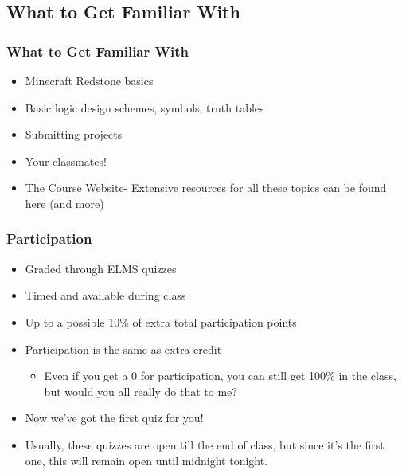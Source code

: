 \documentclass{beamer}
\begin{document}
        \subsection{What to Get Familiar With}
        
            \begin{frame}
                \frametitle{What to Get Familiar With}
                    \begin{itemize}
                        \item Minecraft Redstone basics
                        \item Basic logic design schemes, symbols, truth tables
                        \item Submitting projects
                        \item Your classmates!
                        \item The Course Website- Extensive resources for all these topics can be found here (and more)
                    \end{itemize}
            \end{frame}
            
            \begin{frame}
                \frametitle{Participation}
                    \begin{itemize}
                        \item Graded through ELMS quizzes
                        \item Timed and available during class
                        \item Up to a possible 10\% of extra total participation points
                        \item Participation is the same as extra credit
                            \begin{itemize}
                                \item Even if you get a 0 for participation, you can still get 100\% in the class, but would you all really do that to me?
                            \end{itemize}
                        \item Now we've got the first quiz for you!
                        \item Usually, these quizzes are open till the end of class, but since it's the first one, this will remain open until midnight tonight.
                    \end{itemize}
            \end{frame}
            
\end{document}
